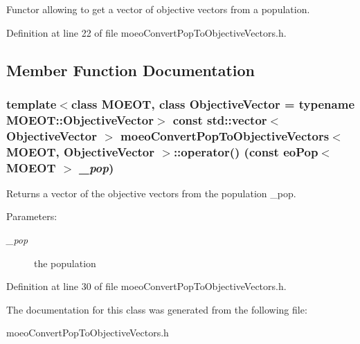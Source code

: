 Functor allowing to get a vector of objective vectors from a population. 



Definition at line 22 of file moeo\-Convert\-Pop\-To\-Objective\-Vectors.h.

\subsection{Member Function Documentation}
\subsubsection{\setlength{\rightskip}{0pt plus 5cm}template$<$class MOEOT, class Objective\-Vector = typename MOEOT::Objective\-Vector$>$ const std::vector$<$ Objective\-Vector $>$ {\bf moeo\-Convert\-Pop\-To\-Objective\-Vectors}$<$ MOEOT, Objective\-Vector $>$::operator() (const {\bf eo\-Pop}$<$ MOEOT $>$ {\em \_\-pop})\hspace{0.3cm}{\tt  [inline]}}\label{classmoeoConvertPopToObjectiveVectors_8fada75aa151a6eaa310c5064f783c86}


Returns a vector of the objective vectors from the population \_\-pop. 

\begin{Desc}
\item[Parameters:]
\begin{description}
\item[{\em \_\-pop}]the population \end{description}
\end{Desc}


Definition at line 30 of file moeo\-Convert\-Pop\-To\-Objective\-Vectors.h.

The documentation for this class was generated from the following file:\begin{CompactItemize}
\item 
moeo\-Convert\-Pop\-To\-Objective\-Vectors.h\end{CompactItemize}
